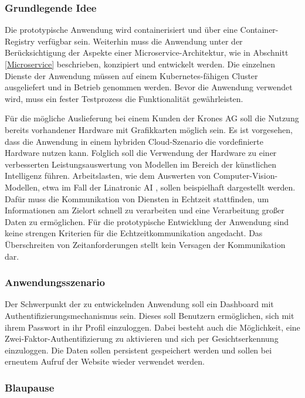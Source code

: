 \subsubsection{Grundlegende Idee}\label{idee}

Die prototypische Anwendung wird containerisiert und über eine Container-Registry verfügbar sein. 
Weiterhin muss die Anwendung unter der Berücksichtigung der Aspekte einer Microservice-Architektur, wie in Abschnitt \ref{Microservice} beschrieben, konzipiert und entwickelt werden. 
Die einzelnen Dienste der Anwendung müssen auf einem Kubernetes-fähigen Cluster ausgeliefert und in Betrieb genommen werden.
Bevor die Anwendung verwendet wird, muss ein fester Testprozess die Funktionalität gewährleisten.

Für die mögliche Auslieferung bei einem Kunden der Krones AG soll die Nutzung bereits vorhandener Hardware mit Grafikkarten möglich sein. 
Es ist vorgesehen, dass die Anwendung in einem hybriden Cloud-Szenario die vordefinierte Hardware nutzen kann. 
Folglich soll die Verwendung der Hardware zu einer verbesserten Leistungsauswertung von Modellen im Bereich der künstlichen Intelligenz führen. 
Arbeitslasten, wie dem Auswerten von Computer-Vision-Modellen, etwa im Fall der Linatronic AI \cite{linatronic}, sollen beispielhaft dargestellt werden. 
Dafür muss die Kommunikation von Diensten in Echtzeit stattfinden, um Informationen am Zielort schnell zu verarbeiten und eine Verarbeitung großer Daten zu ermöglichen.
Für die prototypische Entwicklung der Anwendung sind keine strengen Kriterien für die Echtzeitkommunikation angedacht.
Das Überschreiten von Zeitanforderungen stellt kein Versagen der Kommunikation dar.


\subsubsection{Anwendungsszenario}\label{Anwendungsszenario}

Der Schwerpunkt der zu entwickelnden Anwendung soll ein Dashboard mit Authentifizierungsmechanismus sein. 
Dieses soll Benutzern ermöglichen, sich mit ihrem Passwort in ihr Profil einzuloggen. 
Dabei besteht auch die Möglichkeit, eine Zwei-Faktor-Authentifizierung zu aktivieren und sich per Gesichtserkennung einzuloggen.
Die Daten sollen persistent gespeichert werden und sollen bei erneutem Aufruf der Website wieder verwendet werden. 

\subsubsection{Blaupause}

